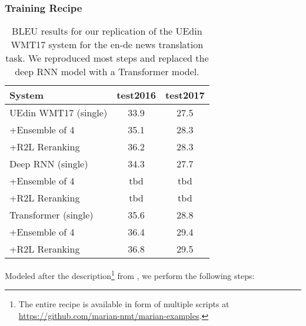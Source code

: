 \documentclass[11pt,a4paper]{article}
\begin{document}
\subsubsection{Training Recipe}

\begin{table}[t]
\centering
\begin{tabular}{lcc}\toprule
System &	test2016 &	test2017 \\ \midrule
UEdin WMT17 (single) & 33.9 & 27.5 \\ 
+Ensemble of 4 & 35.1 & 28.3 \\ 
+R2L Reranking & 36.2 &	28.3 \\ \midrule \midrule
Deep RNN (single) & 34.3 & 27.7 \\ 
+Ensemble of 4 & tbd & tbd \\ 
+R2L Reranking & tbd & tbd \\ \midrule
Transformer (single) &	35.6 &	28.8 \\
+Ensemble of 4 &	36.4 &	29.4 \\ 
+R2L Reranking &	36.8 &	29.5 \\ \bottomrule
\end{tabular}
\caption{BLEU results for our replication of the UEdin WMT17 system for the en-de news translation task. We reproduced most steps and replaced
the deep RNN model with a Transformer model.}
\label{wmt-bleu}
\end{table}

Modeled after the description\footnote{The entire recipe is available in form of multiple scripts at \url{https://github.com/marian-nmt/marian-examples}.} from , we perform the following steps:
\end{document}
